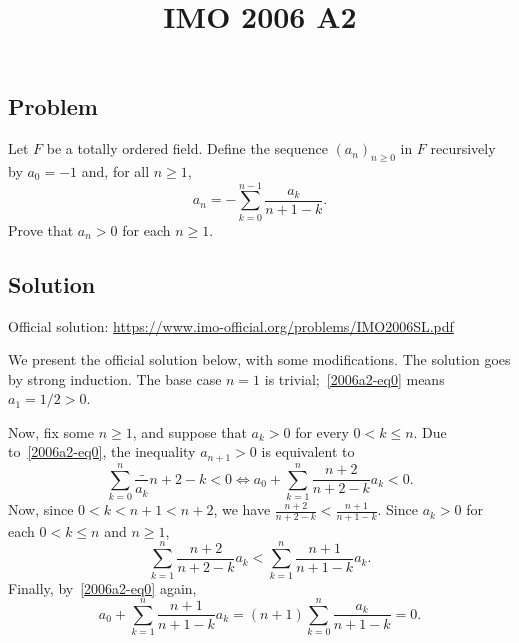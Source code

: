 \documentclass{article}
\title{IMO 2006 A2}
\author{}
\date{}
\begin{document}
\maketitle



\subsection*{Problem}

Let $F$ be a totally ordered field.
Define the sequence $(a_n)_{n \geq 0}$ in $F$ recursively by $a_0 = -1$ and, for all $n \geq 1$,
\[ a_n = - \sum_{k = 0}^{n - 1} \frac{a_k}{n + 1 - k}. \tag{*}\label{2006a2-eq0} \]
Prove that $a_n > 0$ for each $n \geq 1$.



\subsection*{Solution}

Official solution: \url{https://www.imo-official.org/problems/IMO2006SL.pdf}

We present the official solution below, with some modifications.
The solution goes by strong induction.
The base case $n = 1$ is trivial;~\eqref{2006a2-eq0} means $a_1 = 1/2 > 0$.

Now, fix some $n \geq 1$, and suppose that $a_k > 0$ for every $0 < k \leq n$.
Due to~\eqref{2006a2-eq0}, the inequality $a_{n + 1} > 0$ is equivalent to
\[ \sum_{k = 0}^n \frac_{a_k}{n + 2 - k} < 0 \iff a_0 + \sum_{k = 1}^n \frac{n + 2}{n + 2 - k} a_k < 0. \]
Now, since $0 < k < n + 1 < n + 2$, we have $\frac{n + 2}{n + 2 - k} < \frac{n + 1}{n + 1 - k}$.
Since $a_k > 0$ for each $0 < k \leq n$ and $n \geq 1$,
\[ \sum_{k = 1}^n \frac{n + 2}{n + 2 - k} a_k < \sum_{k = 1}^n \frac{n + 1}{n + 1 - k} a_k. \]
Finally, by~\eqref{2006a2-eq0} again,
\[ a_0 + \sum_{k = 1}^n \frac{n + 1}{n + 1 - k} a_k = (n + 1) \sum_{k = 0}^n \frac{a_k}{n + 1 - k} = 0. \]
\end{document}
